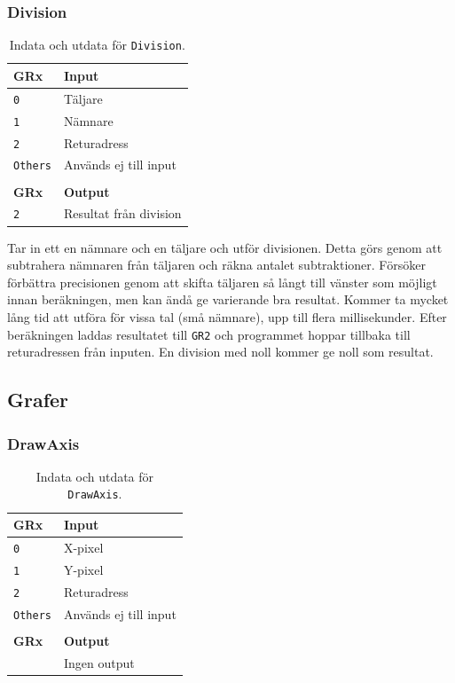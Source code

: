 \documentclass[]{article}
\begin{document}
\subsubsection{Division}
\begin{table}[H]
\centering
\begin{tabular}{ll}
	\textbf{GRx}    & \textbf{Input}         \\ \hline
	\texttt{0}      & Täljare                \\
	\texttt{1}      & Nämnare                \\
	\texttt{2}      & Returadress            \\
	\texttt{Others} & Används ej till input  \\
	                &  \\
	\textbf{GRx}    & \textbf{Output}        \\ \hline
	\texttt{2}      & Resultat från division
\end{tabular}
\caption{Indata och utdata för \texttt{Division}.}
\end{table}

\noindent
Tar in ett en nämnare och en täljare och utför divisionen. Detta görs genom att subtrahera nämnaren från täljaren och räkna antalet subtraktioner. Försöker förbättra precisionen genom att skifta täljaren så långt till vänster som möjligt innan beräkningen, men kan ändå ge varierande bra resultat. Kommer ta mycket lång tid att utföra för vissa tal (små nämnare), upp till flera millisekunder. Efter beräkningen laddas resultatet till \texttt{GR2} och programmet hoppar tillbaka till returadressen från inputen. En division med noll kommer ge noll som resultat.

\newpage
\subsection{Grafer}

\subsubsection{DrawAxis}
\label{sec:drawaxis}

\begin{table}[H]
\centering
\begin{tabular}{ll}
	\textbf{GRx}    & \textbf{Input}        \\ \hline
	\texttt{0}      & X-pixel               \\
	\texttt{1}      & Y-pixel               \\
	\texttt{2}      & Returadress           \\
	\texttt{Others} & Används ej till input \\
	             &  \\
	\textbf{GRx} & \textbf{Output}              \\ \hline
	             & Ingen output
\end{tabular}
\caption{Indata och utdata för \texttt{DrawAxis}.}
\end{table}
\end{document}
